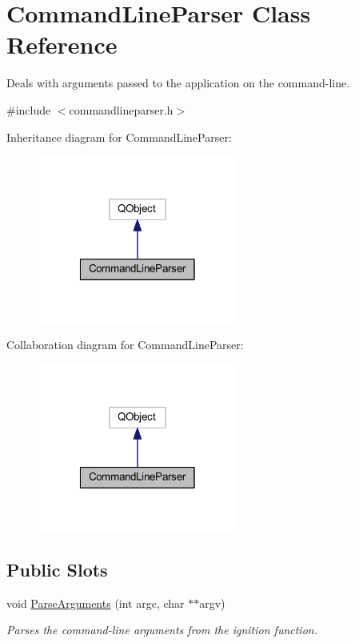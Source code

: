 \hypertarget{class_command_line_parser}{\section{Command\-Line\-Parser Class Reference}
\label{class_command_line_parser}
}


Deals with arguments passed to the application on the command-\/line.  




{\ttfamily \#include $<$commandlineparser.\-h$>$}



Inheritance diagram for Command\-Line\-Parser\-:\nopagebreak
\begin{figure}[H]
\begin{center}
\leavevmode
\includegraphics[width=186pt]{class_command_line_parser__inherit__graph}
\end{center}
\end{figure}


Collaboration diagram for Command\-Line\-Parser\-:\nopagebreak
\begin{figure}[H]
\begin{center}
\leavevmode
\includegraphics[width=186pt]{class_command_line_parser__coll__graph}
\end{center}
\end{figure}
\subsection*{Public Slots}
\begin{DoxyCompactItemize}
\item 
void \hyperlink{class_command_line_parser_a6a39c14ecf639b02bf8a71ac224b0a61}{Parse\-Arguments} (int argc, char $\ast$$\ast$argv)
\begin{DoxyCompactList}\small\item\em Parses the command-\/line arguments from the ignition function. \end{DoxyCompactList}\end{DoxyCompactItemize}
